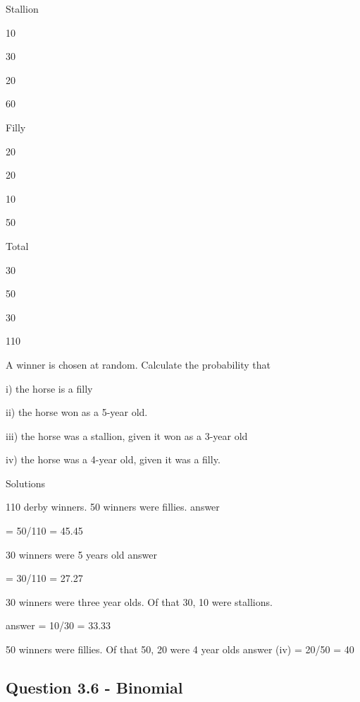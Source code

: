 \documentclass[]{report}
\begin{document}
Stallion


10


30


20


60




Filly


20


20


10


50




Total


30


50


30


110




A winner is chosen at random. Calculate the probability that

i) the horse is a filly

ii) the horse won as a 5-year old.

iii) the horse was a stallion, given it won as a 3-year old

iv) the horse was a 4-year old, given it was a filly.




Solutions


110 derby winners. 50 winners were fillies.                                              answer 

= 50/110 = 45.45 %


30 winners were 5 years old                                                    answer 

= 30/110 = 27.27%



30 winners were three year olds. Of that 30, 10 were stallions.       

answer = 10/30 = 33.33%


50 winners were fillies. Of that 50, 20 were 4 year olds                                                  answer (iv) = 20/50 = 40%









\subsection{Question 3.6 - Binomial}
\end{document}
